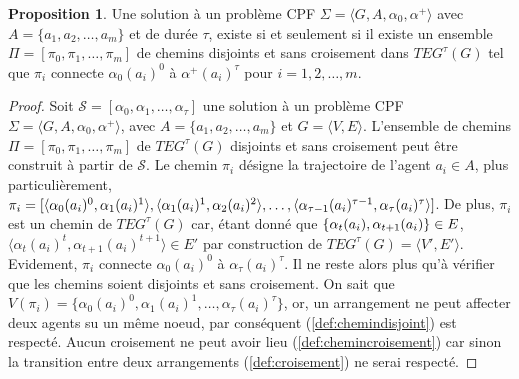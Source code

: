 \documentclass[french, 10pt, letterpaper]{article}
\theoremstyle{definition}
\theoremstyle{proposition}
\newtheorem{proposition}[definition]{Proposition}
\theoremstyle{example}
\begin{document}
    \begin{proposition}
        Une solution à un problème CPF $\Sigma = \langle G, A, \alpha_0, \alpha^+ \rangle$ avec $A = \{a_1, a_2, \ldots, a_m\}$ et de durée $\tau$,
        existe si et seulement si il existe un ensemble $\Pi = [\pi_0, \pi_1, \ldots, \pi_m]$ de chemins disjoints et sans croisement dans $TEG^\tau(G)$
        tel que $\pi_i$ connecte $\alpha_0(a_i)^0$ à $\alpha^+(a_i)^\tau$ pour $i = 1, 2, \ldots, m$.
    \end{proposition}

    \begin{proof}
        Soit $\mathcal{S} = [\alpha_0, \alpha_1, \ldots, \alpha_\tau]$ une solution à un problème CPF $\Sigma = \langle G, A, \alpha_0, \alpha^+ \rangle$, avec
        $A = \{a_1, a_2, \ldots, a_m\}$ et $G = \langle V, E \rangle$.
        L'ensemble de chemins $\Pi = [\pi_0, \pi_1, \ldots, \pi_m]$ de $TEG^\tau(G)$ disjoints et sans croisement peut être construit à partir de $\mathcal{S}$.
        Le chemin $\pi_i$ désigne la trajectoire de l'agent $a_i \in A$, plus particulièrement, 
        $\pi_i = [\langle \alpha_0(a_i)^0, \alpha_1(a_i)^1 \rangle, \langle \alpha_1(a_i)^1, \alpha_2(a_i)^2 \rangle,
        \ldots, \langle \alpha_{\tau-1}(a_i)^{\tau-1}, \\\alpha_\tau(a_i)^\tau \rangle]$.
        De plus, $\pi_i$ est un chemin de $TEG^\tau(G)$ car, étant donné que $\{\alpha_t(a_i),\\ \alpha_{t+1}(a_i)\} \in E$, 
        $\langle \alpha_t(a_i)^t, \alpha_{t+1}(a_i)^{t+1} \rangle \in E'$ 
        par construction de $TEG^\tau(G) = \langle V', E' \rangle$. 
        Evidement, $\pi_i$ connecte $\alpha_0(a_i)^0$ à $\alpha_\tau(a_i)^\tau$.
        Il ne reste alors plus qu'à vérifier que les chemins soient disjoints et sans croisement.
        On sait que $V(\pi_i) = \{\alpha_0(a_i)^0, \alpha_1(a_i)^1, \ldots, \alpha_\tau(a_i)^\tau\}$, or, un arrangement ne peut affecter deux agents
        su un même noeud, par conséquent (\ref{def:chemindisjoint}) est respecté.
        Aucun croisement ne peut avoir lieu (\ref{def:chemincroisement}) car sinon la transition entre deux arrangements (\ref{def:croisement}) ne serai respecté.


\end{proof}
\end{document}
